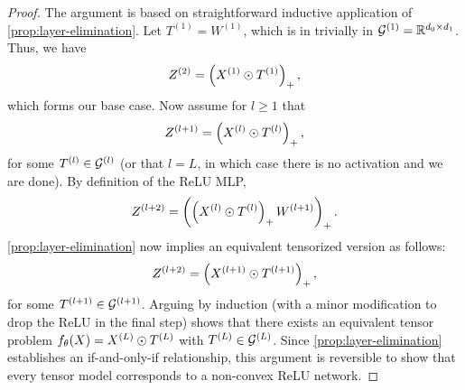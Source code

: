 \tensorEquivalence*
\begin{proof}
    The argument is based on straightforward inductive application of
    \cref{prop:layer-elimination}.
    Let \( T^{(1)} = W^{(1)} \), which is in
    trivially in \( \mathcal{G}^{(1)} = \mathbb{R}^{d_0 \times d_1} \).
    Thus, we have
    \[
        Z^{(2)} = \left(X^{(1)} \odot T^{(1)}\right)_+,
    \]
    which forms our base case.
    Now assume for \( l \geq 1 \) that
    \[
        Z^{(l+1)} = \left(X^{(l)} \odot T^{(l)}\right)_+,
    \]
    for some \( T^{(l)} \in \mathcal{G}^{(l)} \) (or that \( l = L \), in which case
    there is no activation and we are done).
    By definition of the ReLU MLP,
    \[
        Z^{(l+2)} = \left(\left(X^{(l)} \odot T^{(l)}\right)_+ W^{(l+1)}\right)_+.
    \]
    \cref{prop:layer-elimination} now implies an equivalent tensorized
    version as follows:
    \[
        Z^{(l+2)} = \left(X^{(l+1)} \odot T^{(l+1)}\right)_+,
    \]
    for some \( T^{(l+1)} \in \mathcal{G}^{(l+1)} \).
    Arguing by induction (with a minor modification to drop the ReLU in the final step)
    shows that there exists an equivalent
    tensor problem \( f_\theta(X) = X^{(L)} \odot T^{(L)} \) with
    \( T^{(L)} \in \mathcal{G}^{(L)} \).
    Since \cref{prop:layer-elimination} establishes an if-and-only-if
    relationship, this argument is reversible to show that every
    tensor model corresponds to a non-convex ReLU network.
\end{proof}

